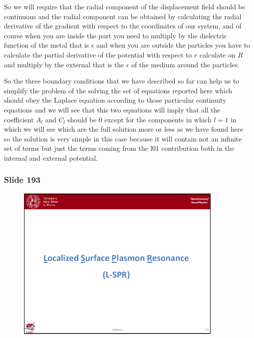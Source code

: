 \documentclass[../main/main.tex]{subfiles}
\begin{document}
So we will require that the radial component of the displacement field should be continuous and the radial component can be obtained by calculating the radial derivative of the gradient with respect to the coordinates of our system, and of course when you are inside the part you need to multiply by the dielectric function of the metal that is $\epsilon$ and when you are outside the particles you have to calculate the partial derivative of the potential with respect to $r$ calculate on $R$ and multiply by the external that is the $\epsilon$ of the medium around the particles.

So the three boundary conditions that we have described so far can help us to simplify the problem of the solving the set of equations reported here which should obey the Laplace equation according to those particular continuity equations and we will see that this two equations will imply that all the coefficient $A_l$ and $C_l$ should be $0$ except for the components in which $l=1$ in which we will see which are the full solution more or less as we have found here so the solution is very simple in this case because it will contain not an infinite set of terms but just the terms coming from the l01 contribution both in the internal and external potential.

\newpage
\subsubsection{Slide 193}

\begin{figure}[h!]
\centering
\includegraphics[page=15,width=0.9\textwidth]{../lessons/pdf_file/11_lesson.pdf}
\end{figure}
\end{document}
